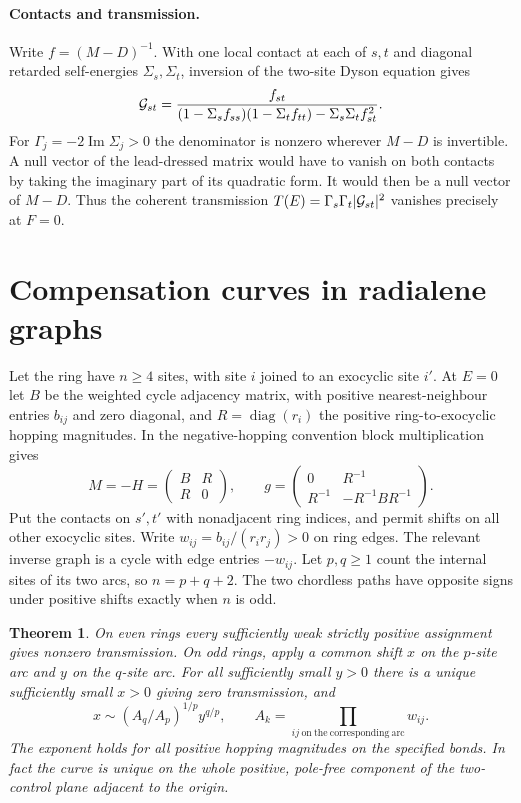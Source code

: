 \documentclass[11pt,a4paper]{article}
\newtheorem{theorem}{Theorem}
\newcommand{\diag}{\operatorname{diag}}
\begin{document}
\paragraph{Contacts and transmission.}
Write $f=(M-D)^{-1}$. With one local contact at each of $s,t$ and diagonal retarded self-energies $\Sigma_s,\Sigma_t$, inversion of the two-site Dyson equation gives
\[
 {\cal G}_{st}=
 \frac{f_{st}}{(1-\Sigma_s f_{ss})(1-\Sigma_t f_{tt})-\Sigma_s\Sigma_t f_{st}^{2}} .
\]
For $\Gamma_j=-2\operatorname{Im}\Sigma_j>0$ the denominator is nonzero wherever $M-D$ is invertible. A null vector of the lead-dressed matrix would have to vanish on both contacts by taking the imaginary part of its quadratic form. It would then be a null vector of $M-D$. Thus the coherent transmission $T(E)=\Gamma_s\Gamma_t|{\cal G}_{st}|^2$ vanishes precisely at $F=0$.

\section{Compensation curves in radialene graphs}\label{sec:rad}
Let the ring have $n\ge4$ sites, with site $i$ joined to an exocyclic site $i'$. At $E=0$ let $B$ be the weighted cycle adjacency matrix, with positive nearest-neighbour entries $b_{ij}$ and zero diagonal, and $R=\diag(r_i)$ the positive ring-to-exocyclic hopping magnitudes. In the negative-hopping convention block multiplication gives
\[
 M=-H=\begin{pmatrix}B&R\\R&0\end{pmatrix},
 \qquad g=\begin{pmatrix}0&R^{-1}\\R^{-1}&-R^{-1}BR^{-1}\end{pmatrix}.
\]
Put the contacts on $s',t'$ with nonadjacent ring indices, and permit shifts on all other exocyclic sites. Write $w_{ij}=b_{ij}/(r_i r_j)>0$ on ring edges. The relevant inverse graph is a cycle with edge entries $-w_{ij}$. Let $p,q\ge1$ count the internal sites of its two arcs, so $n=p+q+2$. The two chordless paths have opposite signs under positive shifts exactly when $n$ is odd.

\begin{theorem}\label{thm:rad}
On even rings every sufficiently weak strictly positive assignment gives nonzero transmission. On odd rings, apply a common shift $x$ on the $p$-site arc and $y$ on the $q$-site arc. For all sufficiently small $y>0$ there is a unique sufficiently small $x>0$ giving zero transmission, and
\begin{equation}
 x\sim (A_q/A_p)^{1/p} y^{q/p},\qquad
 A_k=\prod_{ij\ \mathrm{on\ the\ corresponding\ arc}} w_{ij}.
 \label{eq:scale}
\end{equation}
The exponent holds for all positive hopping magnitudes on the specified bonds. In fact the curve is unique on the whole positive, pole-free component of the two-control plane adjacent to the origin.
\end{theorem}
\end{document}
